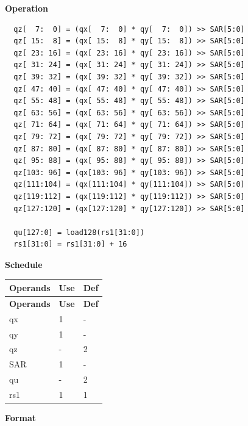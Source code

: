 \textbf{Operation}\\
\begin{lstlisting}
  qz[  7:  0] = (qx[  7:  0] * qy[  7:  0]) >> SAR[5:0]
  qz[ 15:  8] = (qx[ 15:  8] * qy[ 15:  8]) >> SAR[5:0]
  qz[ 23: 16] = (qx[ 23: 16] * qy[ 23: 16]) >> SAR[5:0]
  qz[ 31: 24] = (qx[ 31: 24] * qy[ 31: 24]) >> SAR[5:0]
  qz[ 39: 32] = (qx[ 39: 32] * qy[ 39: 32]) >> SAR[5:0]
  qz[ 47: 40] = (qx[ 47: 40] * qy[ 47: 40]) >> SAR[5:0]
  qz[ 55: 48] = (qx[ 55: 48] * qy[ 55: 48]) >> SAR[5:0]
  qz[ 63: 56] = (qx[ 63: 56] * qy[ 63: 56]) >> SAR[5:0]
  qz[ 71: 64] = (qx[ 71: 64] * qy[ 71: 64]) >> SAR[5:0]
  qz[ 79: 72] = (qx[ 79: 72] * qy[ 79: 72]) >> SAR[5:0]
  qz[ 87: 80] = (qx[ 87: 80] * qy[ 87: 80]) >> SAR[5:0]
  qz[ 95: 88] = (qx[ 95: 88] * qy[ 95: 88]) >> SAR[5:0]
  qz[103: 96] = (qx[103: 96] * qy[103: 96]) >> SAR[5:0]
  qz[111:104] = (qx[111:104] * qy[111:104]) >> SAR[5:0]
  qz[119:112] = (qx[119:112] * qy[119:112]) >> SAR[5:0]
  qz[127:120] = (qx[127:120] * qy[127:120]) >> SAR[5:0]

  qu[127:0] = load128(rs1[31:0])
  rs1[31:0] = rs1[31:0] + 16
\end{lstlisting}


\textbf{Schedule}\\
\begin{longtable}[c]{|l|l|l|}
    \hline
    \rowcolor{lightgray}
    \textbf{Operands} & \textbf{Use} & \textbf{Def} \\\hline
    \endfirsthead
    \hline
    \rowcolor{lightgray}
     \textbf{Operands} & \textbf{Use} & \textbf{Def} \\\hline
    \endhead
    \hline
    \endfoot

    qx & 1 & - \\\hline
  qy & 1 & - \\\hline
     qz & - & 2 \\\hline
    SAR & 1 & - \\\hline
    qu & - & 2 \\\hline
    rs1 & 1 & 1

\end{longtable}

\textbf{Format}\\

